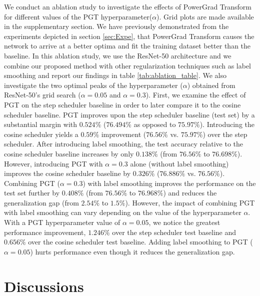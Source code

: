 \documentclass[times,sort&compress]{elsarticle}
\begin{document}
We conduct an ablation study to investigate the effects of PowerGrad Transform for
different values of the PGT hyperparameter($\alpha$). Grid plots are made available in
the supplementary section. We have previously demonstrated from the experiments depicted
in section \ref{sec:Expe}, that PowerGrad Transform causes the network to arrive at a
better optima and fit the training dataset better than the baseline. In this ablation
study, we use the ResNet-50 architecture and we combine our proposed method with other
regularization techniques such as label smoothing and report our findings in table
\ref{tab:ablation_table}. We also investigate the two optimal peaks of the
hyperparameter ($\alpha$) obtained from ResNet-50's grid search ($\alpha=0.05$ and
$\alpha=0.3$). First, we examine the effect of PGT on the step scheduler baseline in
order to later compare it to the cosine scheduler baseline. PGT improves upon the step
scheduler baseline (test set) by a substantial margin with $0.524\%$ ($76.494\%$ as
opposed to $75.97\%$). Introducing the cosine scheduler yields a $0.59\%$ improvement
($76.56\%$ vs. $75.97\%$) over the step scheduler. After introducing label smoothing,
the test accuracy relative to the cosine scheduler baseline increases by only $0.138\%$
(from $76.56\%$ to $76.698\%$). However, introducing PGT with $\alpha=0.3$ alone
(without label smoothing) improves the cosine scheduler baseline by $0.326\%$
($76.886\%$ vs. $76.56\%$). Combining PGT ($\alpha=0.3$) with label smoothing improves
the performance on the test set further by $0.408\%$ (from $76.56\%$ to $76.968\%$) and
reduces the generalization gap (from $2.54\%$ to $1.5\%$). However, the impact of
combining PGT with label smoothing can vary depending on the value of the hyperparameter
$\alpha$. With a PGT hyperparameter value of $\alpha=0.05$, we notice the greatest
performance improvement, $1.246\%$ over the step scheduler test baseline and $0.656\%$
over the cosine scheduler test baseline. Adding label smoothing to PGT ($\alpha=0.05$)
hurts performance even though it reduces the generalization gap.





\section{Discussions}
\label{sec:Disc}
\end{document}
